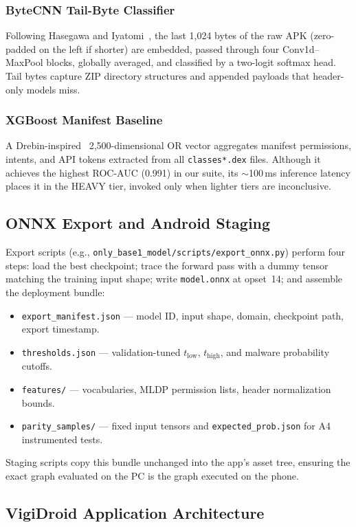 \subsubsection{ByteCNN Tail-Byte Classifier}
Following Hasegawa and Iyatomi~\cite{byteCNN}, the last 1,024 bytes of the raw APK (zero-padded on the left if shorter) are embedded, passed through four Conv1d--MaxPool blocks, globally averaged, and classified by a two-logit softmax head. Tail bytes capture ZIP directory structures and appended payloads that header-only models miss.

\subsubsection{XGBoost Manifest Baseline}
A Drebin-inspired~\cite{drebin} 2,500-dimensional OR vector aggregates manifest permissions, intents, and API tokens extracted from all \texttt{classes*.dex} files. Although it achieves the highest ROC-AUC (0.991) in our suite, its $\sim$100\,ms inference latency places it in the HEAVY tier, invoked only when lighter tiers are inconclusive.

\subsection{ONNX Export and Android Staging}
Export scripts (e.g., \texttt{only\_base1\_model/scripts/export\_onnx.py}) perform four steps: load the best checkpoint; trace the forward pass with a dummy tensor matching the training input shape; write \texttt{model.onnx} at opset~14; and assemble the deployment bundle:
\begin{itemize}
 \item \texttt{export\_manifest.json} --- model ID, input shape, domain, checkpoint path, export timestamp.
 \item \texttt{thresholds.json} --- validation-tuned $t_{\mathrm{low}}$, $t_{\mathrm{high}}$, and malware probability cutoffs.
 \item \texttt{features/} --- vocabularies, MLDP permission lists, header normalization bounds.
 \item \texttt{parity\_samples/} --- fixed input tensors and \texttt{expected\_prob.json} for A4 instrumented tests.
\end{itemize}
Staging scripts copy this bundle unchanged into the app's asset tree, ensuring the exact graph evaluated on the PC is the graph executed on the phone.

\subsection{VigiDroid Application Architecture}
\label{sec:cascade-policy}
